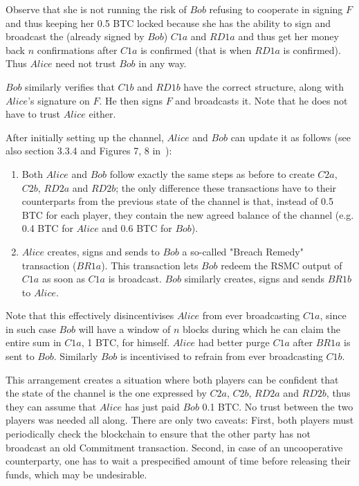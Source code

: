 \begin{enumerate}
    Observe that she is not running the risk of $Bob$ refusing to cooperate in signing $F$
    and thus keeping her 0.5 BTC locked because she has the ability to sign and broadcast
    the (already signed by $Bob$) $C1a$ and $RD1a$ and thus get her money back $n$
    confirmations after $C1a$ is confirmed (that is when $RD1a$ is confirmed). Thus
    $Alice$ need not trust $Bob$ in any way.

    $Bob$ similarly verifies that $C1b$ and $RD1b$ have the correct structure, along with
    $Alice$'s signature on $F$. He then signs $F$ and broadcasts it. Note that he does not
    have to trust $Alice$ either.
  \end{enumerate}

  After initially setting up the channel, $Alice$ and $Bob$ can update it as follows (see
  also section 3.3.4 and Figures 7, 8 in~\cite{lightning}):
  \begin{enumerate}
    \item Both $Alice$ and $Bob$ follow exactly the same steps as before to create $C2a$,
    $C2b$, $RD2a$ and $RD2b$; the only difference these transactions have to their
    counterparts from the previous state of the channel is that, instead of 0.5 BTC for
    each player, they contain the new agreed balance of the channel (e.g. 0.4 BTC for
    $Alice$ and 0.6 BTC for $Bob$).

    \item $Alice$ creates, signs and sends to $Bob$ a so-called "Breach Remedy"
    transaction ($BR1a$). This transaction lets $Bob$ redeem the RSMC output of $C1a$ as
    soon as $C1a$ is broadcast. $Bob$ similarly creates, signs and sends $BR1b$ to
    $Alice$.
  \end{enumerate}
  Note that this effectively disincentivises $Alice$ from ever broadcasting $C1a$,
  since in such case $Bob$ will have a window of $n$ blocks during which he can claim the
  entire sum in $C1a$, 1 BTC, for himself. $Alice$ had better purge $C1a$ after $BR1a$ is
  sent to $Bob$. Similarly $Bob$ is incentivised to refrain from ever broadcasting $C1b$.

  This arrangement creates a situation where both players can be confident that the state
  of the channel is the one expressed by $C2a$, $C2b$, $RD2a$ and $RD2b$, thus they can
  assume that $Alice$ has just paid $Bob$ 0.1 BTC. No trust between the two players was
  needed all along. There are only two caveats: First, both players must periodically
  check the blockchain to ensure that the other party has not broadcast an old Commitment
  transaction. Second, in case of an uncooperative counterparty, one has to wait a
  prespecified amount of time before releasing their funds, which may be undesirable.


